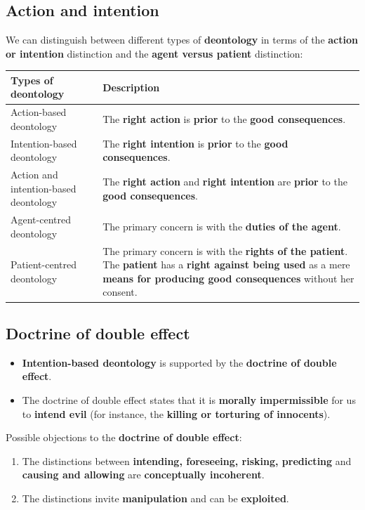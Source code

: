 \documentclass[11pt]{article}
\begin{document}
\subsection{Action and intention}
\label{sec:org36a05a3}
We can distinguish between different types of \textbf{deontology} in terms of the \textbf{action or intention} distinction and the \textbf{agent versus patient} distinction:

\begin{center}
\begin{tabularx}{\textwidth}{|X|X|}
\hline
Types of deontology & Description\\
\hline
Action-based deontology & The \textbf{right action} is \textbf{prior} to the \textbf{good consequences}.\\
\hline
Intention-based deontology & The \textbf{right intention} is \textbf{prior} to the \textbf{good consequences}.\\
\hline
Action and intention-based deontology & The \textbf{right action} and \textbf{right intention} are \textbf{prior} to the \textbf{good consequences}.\\
\hline
Agent-centred deontology & The primary concern is with the \textbf{duties of the agent}.\\
\hline
Patient-centred deontology & The primary concern is with the \textbf{rights of the patient}. The \textbf{patient} has a \textbf{right against being used} as a mere \textbf{means for producing good consequences} without her consent.\\
\hline
\end{tabularx}
\end{center}
\subsection{Doctrine of double effect}
\label{sec:orgc1d88bb}
\begin{itemize}
\item \textbf{Intention-based deontology} is supported by the \textbf{doctrine of double effect}.
\item The doctrine of double effect states that it is \textbf{morally impermissible} for us to \textbf{intend evil} (for instance, the \textbf{killing or torturing of innocents}).
\end{itemize}

Possible objections to the \textbf{doctrine of double effect}:
\begin{enumerate}
\item The distinctions between \textbf{intending, foreseeing, risking, predicting} and \textbf{causing and allowing} are \textbf{conceptually incoherent}.
\item The distinctions invite \textbf{manipulation} and can be \textbf{exploited}.
\end{enumerate}
\end{document}
